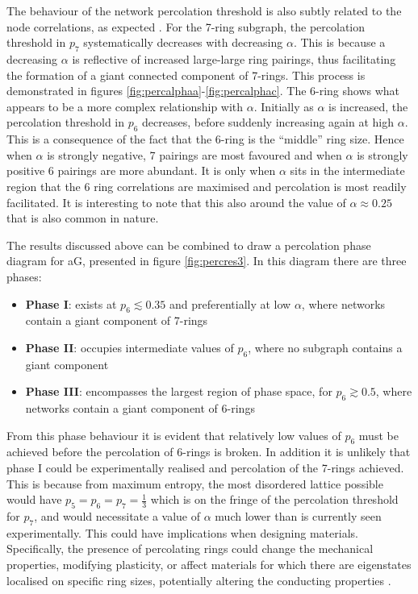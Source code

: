 The behaviour of the network percolation threshold is also subtly related to the node correlations, as expected \cite{Zhou2012,Schmeltzer2014}.
For the 7\--ring subgraph, the percolation threshold in $p_7$ systematically decreases with decreasing $\alpha$.
This is because a decreasing $\alpha$ is reflective of increased large\--large ring pairings, thus facilitating the formation of a giant connected  component of 7\--rings.
This process is demonstrated in figures \ref{fig:percalphaa}\--\ref{fig:percalphac}.
The 6\--ring shows what appears to be a more complex relationship with $\alpha$.
Initially as $\alpha$ is increased, the percolation threshold in $p_6$ decreases, before suddenly increasing again at high $\alpha$.
This is a consequence of the fact that the 6\--ring is the ``middle'' ring size. 
Hence when $\alpha$ is strongly negative, 7 pairings are most favoured and when $\alpha$ is strongly positive 6 pairings are more abundant.
It is only when $\alpha$ sits in the intermediate region that the 6 ring correlations are maximised and percolation is most readily facilitated.
It is interesting to note that this also around the value of $\alpha\approx 0.25$ that is also common in nature.

The results discussed above can be combined to draw a percolation phase diagram for aG, presented in figure \ref{fig:percres3}.
In this diagram there are three phases:
\begin{itemize}
	\item \textbf{Phase I}: exists at $p_6\lesssim 0.35$ and preferentially at low $\alpha$, where networks contain a giant component of 7\--rings
	\item \textbf{Phase II}: occupies intermediate values of $p_6$, where no subgraph contains a giant component
	\item \textbf{Phase III}: encompasses the largest region of phase space, for $p_6\gtrsim0.5$, where networks contain a giant component of 6\--rings
\end{itemize}
From this phase behaviour it is evident that relatively low values of $p_6$ must be achieved before the percolation of 6\--rings is broken.
In addition it is unlikely that phase I could be experimentally realised and percolation of the 7\--rings achieved. 
This is because from maximum entropy, the most disordered lattice possible would have $p_5=p_6=p_7=\frac{1}{3}$ which is on the fringe of the percolation threshold for $p_7$, and would necessitate a value of $\alpha$ much lower than is currently seen experimentally.
This could have implications when designing materials.
Specifically, the presence of percolating rings could change the mechanical properties, modifying plasticity, or affect materials for which there are eigenstates localised on specific ring sizes, potentially altering the conducting properties \cite{Kapko2010,Zhu2016}.

